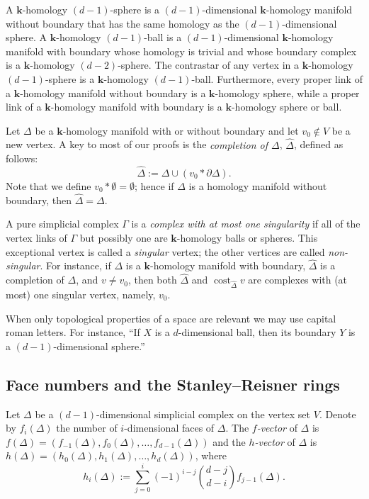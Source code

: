 \documentclass[10pt]{amsart}
\theoremstyle{definition}
\DeclareMathOperator\cost{cost}
\newcommand{\complet}[1]{\hat{#1}}
\newcommand{\field}{\mathbf{k}}
\begin{document}
A $\field$-homology $(d-1)$-sphere is a $(d-1)$-dimensional $\field$-homology manifold without boundary that has the same homology as the $(d-1)$-dimensional sphere. A $\field$-homology $(d-1)$-ball is a $(d-1)$-dimensional $\field$-homology manifold with boundary whose homology is trivial and whose boundary complex is a $\field$-homology $(d-2)$-sphere. The contrastar of any vertex in a $\field$-homology $(d-1)$-sphere is a $\field$-homology $(d-1)$-ball. Furthermore, every proper link of a $\field$-homology manifold without boundary is a $\field$-homology sphere, while a proper link of a $\field$-homology manifold with boundary is a $\field$-homology sphere or ball.

Let $\Delta$ be a $\field$-homology manifold with or without boundary and let $v_0\not\in V$ be a new vertex. A key to most of our proofs is the \emph{completion of $\Delta$}, $\complet{\Delta}$, defined as follows:
\[
\complet{\Delta}:=\Delta\cup (v_0\ast\partial\Delta).
\]
 Note that we define $v_0\ast\emptyset =\emptyset$; hence if $\Delta$ is a homology manifold without boundary, then $\complet{\Delta}=\Delta$. 

A pure simplicial complex $\Gamma$ is a \emph{complex with at most one singularity} if all of the vertex links of $\Gamma$ but possibly one are $\field$-homology balls or spheres. This exceptional vertex is called a \emph{singular} vertex; the other vertices are called \emph{non-singular}. For instance, if $\Delta$ is a $\field$-homology manifold with boundary, $\complet{\Delta}$ is a completion of $\Delta$, and $v\neq v_0$, then both $\complet{\Delta}$ and $\cost_{\complet{\Delta}}v$ are complexes with (at most) one singular vertex, namely, $v_0$.

When only topological properties of a space are relevant we may use capital roman letters. For instance, ``If $X$ is a $d$-dimensional ball, then its boundary $Y$ is a $(d-1)$-dimensional sphere.''


\subsection{Face numbers and the Stanley--Reisner rings} Let $\Delta$ be a $(d-1)$-dimensional simplicial complex on the vertex set $V$. Denote by $f_i(\Delta)$ the number of $i$-dimensional faces of $\Delta$.
The \emph{$f$-vector} of $\Delta$ is $f(\Delta)=(f_{-1}(\Delta), f_0(\Delta),\ldots, f_{d-1}(\Delta))$ and the \emph{$h$-vector} of $\Delta$ is $h(\Delta)=(h_0(\Delta), h_1(\Delta), \ldots, h_d(\Delta))$, where 
\[h_i(\Delta):=\sum_{j=0}^i (-1)^{i-j}\binom{d-j}{d-i}f_{j-1}(\Delta).\]
\end{document}
